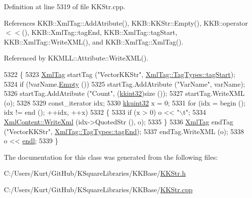 Definition at line 5319 of file K\+K\+Str.\+cpp.



References K\+K\+B\+::\+Xml\+Tag\+::\+Add\+Atribute(), K\+K\+B\+::\+K\+K\+Str\+::\+Empty(), K\+K\+B\+::operator$<$$<$(), K\+K\+B\+::\+Xml\+Tag\+::tag\+End, K\+K\+B\+::\+Xml\+Tag\+::tag\+Start, K\+K\+B\+::\+Xml\+Tag\+::\+Write\+X\+M\+L(), and K\+K\+B\+::\+Xml\+Tag\+::\+Xml\+Tag().



Referenced by K\+K\+M\+L\+L\+::\+Attribute\+::\+Write\+X\+M\+L().


\begin{DoxyCode}
5322 \{
5323   \hyperlink{class_k_k_b_1_1_xml_tag}{XmlTag}  startTag (\textcolor{stringliteral}{"VectorKKStr"}, \hyperlink{class_k_k_b_1_1_xml_tag_a6c0ef0e23f982f49d55d4fb7eaff6ac9ab02b23b5e15b3a1353771313e1176ce0}{XmlTag::TagTypes::tagStart});
5324   \textcolor{keywordflow}{if}  (!varName.\hyperlink{class_k_k_b_1_1_k_k_str_ac69942f73fffd672ec2a6e1c410afdb6}{Empty} ())
5325     startTag.AddAtribute (\textcolor{stringliteral}{"VarName"}, varName);
5326   startTag.AddAtribute (\textcolor{stringliteral}{"Count"}, (\hyperlink{namespace_k_k_b_a8fa4952cc84fda1de4bec1fbdd8d5b1b}{kkint32})size ());
5327   startTag.WriteXML (o);
5328 
5329   const\_iterator  idx;
5330   \hyperlink{namespace_k_k_b_af8d832f05c54994a1cce25bd5743e19a}{kkuint32} x = 0;
5331   \textcolor{keywordflow}{for}  (idx = begin ();  idx != end ();  ++idx, ++x)
5332   \{
5333     \textcolor{keywordflow}{if}  (x > 0)  o << \textcolor{stringliteral}{"\(\backslash\)t"};
5334     \hyperlink{class_k_k_b_1_1_xml_content_ab0e370562d215b8e19dac6d18c4a95e1}{XmlContent::WriteXml} (idx->QuotedStr (), o);
5335   \}
5336   \hyperlink{class_k_k_b_1_1_xml_tag}{XmlTag}  endTag (\textcolor{stringliteral}{"VectorKKStr"}, \hyperlink{class_k_k_b_1_1_xml_tag_a6c0ef0e23f982f49d55d4fb7eaff6ac9a3ceaa9a790f688ec97a35b5a3fd3b164}{XmlTag::TagTypes::tagEnd});
5337   endTag.WriteXML (o);
5338   o << \hyperlink{namespace_k_k_b_ad1f50f65af6adc8fa9e6f62d007818a8}{endl};
5339 \}
\end{DoxyCode}


The documentation for this class was generated from the following files\+:\begin{DoxyCompactItemize}
\item 
C\+:/\+Users/\+Kurt/\+Git\+Hub/\+K\+Square\+Libraries/\+K\+K\+Base/\hyperlink{_k_k_str_8h}{K\+K\+Str.\+h}\item 
C\+:/\+Users/\+Kurt/\+Git\+Hub/\+K\+Square\+Libraries/\+K\+K\+Base/\hyperlink{_k_k_str_8cpp}{K\+K\+Str.\+cpp}\end{DoxyCompactItemize}
